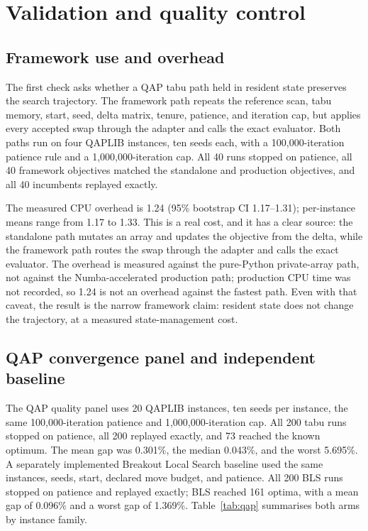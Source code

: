 \documentclass[10pt]{article}
\begin{document}
\section{Validation and quality control}

\subsection{Framework use and overhead}

The first check asks whether a QAP tabu path held in resident state preserves the search trajectory.
The framework path repeats the reference scan, tabu memory, start, seed, delta matrix, tenure,
patience, and iteration cap, but applies every accepted swap through the adapter and calls the exact
evaluator. Both paths run on four QAPLIB instances, ten seeds each, with a 100,000-iteration
patience rule and a 1,000,000-iteration cap. All 40 runs stopped on patience, all 40 framework
objectives matched the standalone and production objectives, and all 40 incumbents replayed exactly.

The measured CPU overhead is 1.24 (95\% bootstrap CI 1.17--1.31); per-instance means range from 1.17
to 1.33. This is a real cost, and it has a clear source: the
standalone path mutates an array and updates the objective from the delta, while the framework path
routes the swap through the adapter and calls the exact evaluator. The overhead is measured against
the pure-Python private-array path, not against the Numba-accelerated production path; production CPU
time was not recorded, so 1.24 is not an overhead against the fastest path. Even with that caveat,
the result is the narrow framework claim: resident state does not change the trajectory, at a
measured state-management cost.



\subsection{QAP convergence panel and independent baseline}

The QAP quality panel uses 20 QAPLIB instances, ten seeds per instance, the same 100,000-iteration
patience and 1,000,000-iteration cap. All 200 tabu runs stopped on patience, all 200 replayed
exactly, and 73 reached the known optimum. The mean gap was 0.301\%, the median 0.043\%, and the
worst 5.695\%. A separately implemented Breakout Local Search baseline \citep{benlic2013} used the
same instances, seeds, start, declared move budget, and patience. All 200 BLS runs stopped on
patience and replayed exactly; BLS reached 161 optima, with a mean gap of 0.096\% and a worst gap of
1.369\%. Table~\ref{tab:qap} summarises both arms by instance family.
\end{document}
